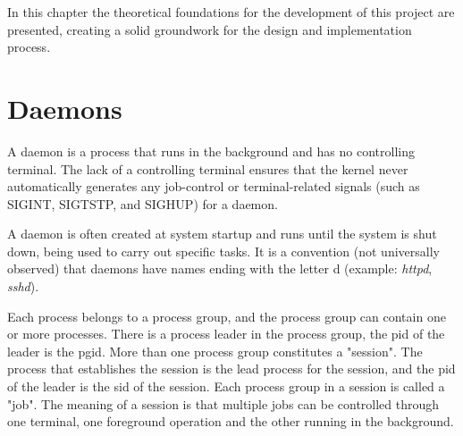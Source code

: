 In this chapter the theoretical foundations for the development of this project are presented, creating a solid groundwork for the design and implementation process.





\clearpage
\section{Daemons}
A daemon is a process that runs in the background and has no controlling terminal. The lack of a controlling terminal ensures that the kernel never automatically generates any job-control or terminal-related signals (such as SIGINT, SIGTSTP, and SIGHUP) for a daemon. \cite{linux_progr_interface}

A daemon is often created at system startup and runs until the system is shut down, being used to carry out specific tasks. It is a convention (not universally observed) that daemons have names ending with the letter d (example: \textit{httpd}, \textit{sshd}). 

Each process belongs to a process group, and the process group can contain one or more processes. There is a process leader in the process group, the \ac{pid} of the leader is the \ac{pgid}. More than one process group constitutes a "session". The process that establishes the session is the lead process for the session, and the \ac{pid} of the leader is the \ac{sid} of the session. Each process group in a session is called a "job". The meaning of a session is that multiple jobs can be controlled through one terminal, one foreground operation and the other running in the background. \cite{daemons}\newline


